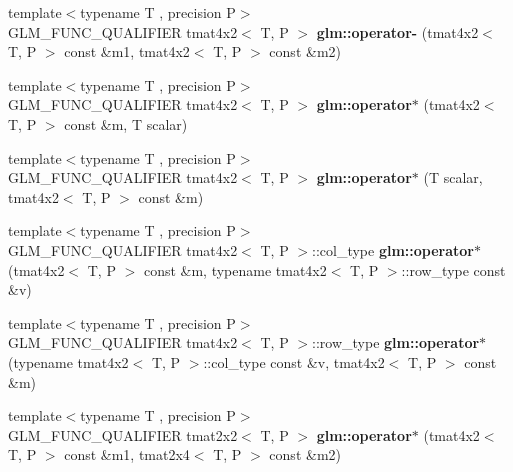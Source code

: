 \begin{DoxyCompactItemize}
\item 
\mbox{\label{type__mat4x2_8inl_a067e8e20b493b92468065177c1439cad}} 
{\footnotesize template$<$typename T , precision P$>$ }\\G\+L\+M\+\_\+\+F\+U\+N\+C\+\_\+\+Q\+U\+A\+L\+I\+F\+I\+ER tmat4x2$<$ T, P $>$ {\bfseries glm\+::operator-\/} (tmat4x2$<$ T, P $>$ const \&m1, tmat4x2$<$ T, P $>$ const \&m2)
\item 
\mbox{\label{type__mat4x2_8inl_ae87d95930eef36824b4efafbb7b5e6df}} 
{\footnotesize template$<$typename T , precision P$>$ }\\G\+L\+M\+\_\+\+F\+U\+N\+C\+\_\+\+Q\+U\+A\+L\+I\+F\+I\+ER tmat4x2$<$ T, P $>$ {\bfseries glm\+::operator$\ast$} (tmat4x2$<$ T, P $>$ const \&m, T scalar)
\item 
\mbox{\label{type__mat4x2_8inl_a61e416bc699930428bb16f66b93d7ab1}} 
{\footnotesize template$<$typename T , precision P$>$ }\\G\+L\+M\+\_\+\+F\+U\+N\+C\+\_\+\+Q\+U\+A\+L\+I\+F\+I\+ER tmat4x2$<$ T, P $>$ {\bfseries glm\+::operator$\ast$} (T scalar, tmat4x2$<$ T, P $>$ const \&m)
\item 
\mbox{\label{type__mat4x2_8inl_a3c8f8da268292ca55b88850c5ade90e8}} 
{\footnotesize template$<$typename T , precision P$>$ }\\G\+L\+M\+\_\+\+F\+U\+N\+C\+\_\+\+Q\+U\+A\+L\+I\+F\+I\+ER tmat4x2$<$ T, P $>$\+::col\+\_\+type {\bfseries glm\+::operator$\ast$} (tmat4x2$<$ T, P $>$ const \&m, typename tmat4x2$<$ T, P $>$\+::row\+\_\+type const \&v)
\item 
\mbox{\label{type__mat4x2_8inl_a0137c6449a730160b2b3905ddddcd382}} 
{\footnotesize template$<$typename T , precision P$>$ }\\G\+L\+M\+\_\+\+F\+U\+N\+C\+\_\+\+Q\+U\+A\+L\+I\+F\+I\+ER tmat4x2$<$ T, P $>$\+::row\+\_\+type {\bfseries glm\+::operator$\ast$} (typename tmat4x2$<$ T, P $>$\+::col\+\_\+type const \&v, tmat4x2$<$ T, P $>$ const \&m)
\item 
\mbox{\label{type__mat4x2_8inl_ae6809ec794b89dfe2748f928eee93d9e}} 
{\footnotesize template$<$typename T , precision P$>$ }\\G\+L\+M\+\_\+\+F\+U\+N\+C\+\_\+\+Q\+U\+A\+L\+I\+F\+I\+ER tmat2x2$<$ T, P $>$ {\bfseries glm\+::operator$\ast$} (tmat4x2$<$ T, P $>$ const \&m1, tmat2x4$<$ T, P $>$ const \&m2)

\end{DoxyCompactItemize}
